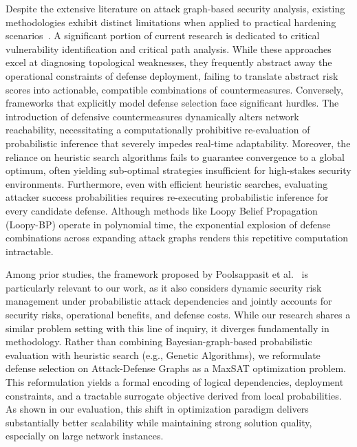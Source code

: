 \documentclass[conference]{IEEEtran}
\theoremstyle{definition} %
\theoremstyle{plain} %
\begin{document}
Despite the extensive literature on attack graph-based security analysis, existing methodologies exhibit distinct limitations when applied to practical hardening scenarios~\cite{dewri2007optimal,mehta2006ranking}. A significant portion of current research is dedicated to critical vulnerability identification and critical path analysis. While these approaches excel at diagnosing topological weaknesses, they frequently abstract away the operational constraints of defense deployment, failing to translate abstract risk scores into actionable, compatible combinations of countermeasures. Conversely, frameworks that explicitly model defense selection face significant hurdles. The introduction of defensive countermeasures dynamically alters network reachability, necessitating a computationally prohibitive re-evaluation of probabilistic inference that severely impedes real-time adaptability. Moreover, the reliance on heuristic search algorithms fails to guarantee convergence to a global optimum, often yielding sub-optimal strategies insufficient for high-stakes security environments. Furthermore, even with efficient heuristic searches, evaluating attacker success probabilities requires re-executing probabilistic inference for every candidate defense. Although methods like Loopy Belief Propagation (Loopy-BP) operate in polynomial time, the exponential explosion of defense combinations across expanding attack graphs renders this repetitive computation intractable.

Among prior studies, the framework proposed by Poolsappasit et al.~\cite{poolsappasit2011dynamic} is particularly relevant to our work, as it also considers dynamic security risk management under probabilistic attack dependencies and jointly accounts for security risks, operational benefits, and defense costs. While our research shares a similar problem setting with this line of inquiry, it diverges fundamentally in methodology. Rather than combining Bayesian-graph-based probabilistic evaluation with heuristic search (e.g., Genetic Algorithms), we reformulate defense selection on Attack-Defense Graphs as a MaxSAT optimization problem. This reformulation yields a formal encoding of logical dependencies, deployment constraints, and a tractable surrogate objective derived from local probabilities. As shown in our evaluation, this shift in optimization paradigm delivers substantially better scalability while maintaining strong solution quality, especially on large network instances.
\end{document}
